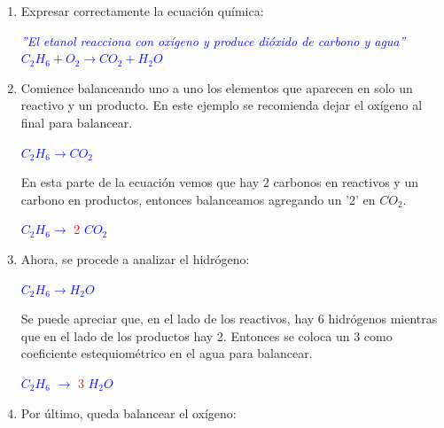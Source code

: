             \begin{enumerate}
                \item Expresar correctamente la ecuación química:
                \begin{center}
                    \textcolor{blue}{\textit{''El etanol reacciona con oxígeno y produce dióxido de carbono y agua''}} \\[5pt]
                    \textcolor{blue}{$ C_2H_6 + O_2 \rightarrow CO_2 + H_2O$}
                \end{center}

            \item Comience balanceando uno a uno los elementos que aparecen en solo un reactivo y un producto. En este ejemplo se recomienda dejar el oxígeno al final para balancear.
                \begin{center}
                    \textcolor{blue}{$C_2H_6 \rightarrow CO_2$}
                \end{center}

                \indent En esta parte de la ecuación vemos que hay 2 carbonos en reactivos y un carbono en productos, entonces balanceamos agregando un '2' en $CO_2$.

                \begin{center}
                    \textcolor{blue}{$C_2H_6 \rightarrow$} \textcolor{red}{2} \textcolor{blue}{$CO_2$}
                \end{center}

                \item Ahora, se procede a analizar el hidrógeno:
                \begin{center}
                    \textcolor{blue}{$C_2H_6 \rightarrow H_2O$}
                \end{center}

                \indent Se puede apreciar que, en el lado de los reactivos, hay 6 hidrógenos mientras que en el lado de los productos hay 2. Entonces se coloca un 3 como coeficiente estequiométrico en el agua para balancear.

                \begin{center}
                    \textcolor{blue}{$C_2H_6$} \textcolor{blue}{$\rightarrow$} \textcolor{red}{$3$} \textcolor{blue}{$H_2O$}
                \end{center}
                
               \item Por último, queda balancear el oxígeno:


\end{enumerate}
